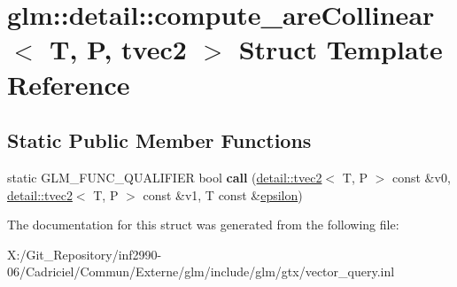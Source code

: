 \hypertarget{structglm_1_1detail_1_1compute__are_collinear_3_01_t_00_01_p_00_01tvec2_01_4}{\section{glm\-:\-:detail\-:\-:compute\-\_\-are\-Collinear$<$ T, P, tvec2 $>$ Struct Template Reference}
\label{structglm_1_1detail_1_1compute__are_collinear_3_01_t_00_01_p_00_01tvec2_01_4}
}
\subsection*{Static Public Member Functions}
\begin{DoxyCompactItemize}
\item 
\hypertarget{structglm_1_1detail_1_1compute__are_collinear_3_01_t_00_01_p_00_01tvec2_01_4_a2f040e5d783927c363a8c14c5cec65d8}{static G\-L\-M\-\_\-\-F\-U\-N\-C\-\_\-\-Q\-U\-A\-L\-I\-F\-I\-E\-R bool {\bfseries call} (\hyperlink{structglm_1_1detail_1_1tvec2}{detail\-::tvec2}$<$ T, P $>$ const \&v0, \hyperlink{structglm_1_1detail_1_1tvec2}{detail\-::tvec2}$<$ T, P $>$ const \&v1, T const \&\hyperlink{group__gtc__constants_gacb41049b8d22c8aa90e362b96c524feb}{epsilon})}\label{structglm_1_1detail_1_1compute__are_collinear_3_01_t_00_01_p_00_01tvec2_01_4_a2f040e5d783927c363a8c14c5cec65d8}

\end{DoxyCompactItemize}


The documentation for this struct was generated from the following file\-:\begin{DoxyCompactItemize}
\item 
X\-:/\-Git\-\_\-\-Repository/inf2990-\/06/\-Cadriciel/\-Commun/\-Externe/glm/include/glm/gtx/vector\-\_\-query.\-inl\end{DoxyCompactItemize}
